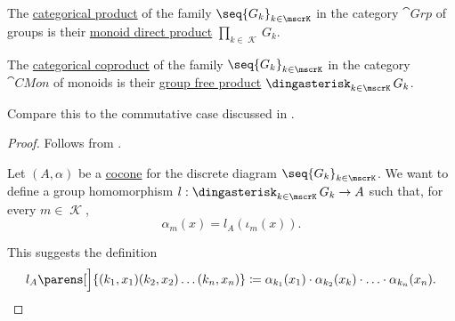 \begin{proposition}\label{thm:group_categorical_limits}
  \hfill
  \begin{thmenum}
     The \hyperref[def:discrete_category_limits]{categorical product} of the family \( \seq{ G_k }_{k \in \mscrK} \) in the category \hyperref[def:group/category]{\( \cat{Grp} \)} of groups is their \hyperref[def:monoid_direct_product]{monoid direct product} \( \prod_{k \in \mscrK} G_k \).

     The \hyperref[def:discrete_category_limits]{categorical coproduct} of the family \( \seq{ G_k }_{k \in \mscrK} \) in the category \hyperref[def:monoid/category]{\( \cat{CMon} \)} of  monoids is their \hyperref[def:group_free_product]{group free product} \( \Ast_{k \in \mscrK} G_k \).

    Compare this to the commutative case discussed in .
  \end{thmenum}
\end{proposition}
\begin{proof}
   Follows from .

    Let \( (A, \alpha) \) be a \hyperref[def:category_of_cones/cocone]{cocone} for the discrete diagram \( \seq{ G_k }_{k \in \mscrK} \). We want to define a group homomorphism \( l: \Ast_{k \in \mscrK} G_k \to A \) such that, for every \( m \in \mscrK \),
  \begin{equation*}
    \alpha_m(x) = l_A(\iota_m(x)).
  \end{equation*}

  This suggests the definition
  \begin{equation*}
    l_A\parens[\Big]{ (k_1, x_1) (k_2, x_2) \ldots (k_n, x_n) } \coloneqq \alpha_{k_1}(x_1) \cdot \alpha_{k_2}(x_k) \cdot \ldots \cdot \alpha_{k_n}(x_n).
  \end{equation*}
\end{proof}
